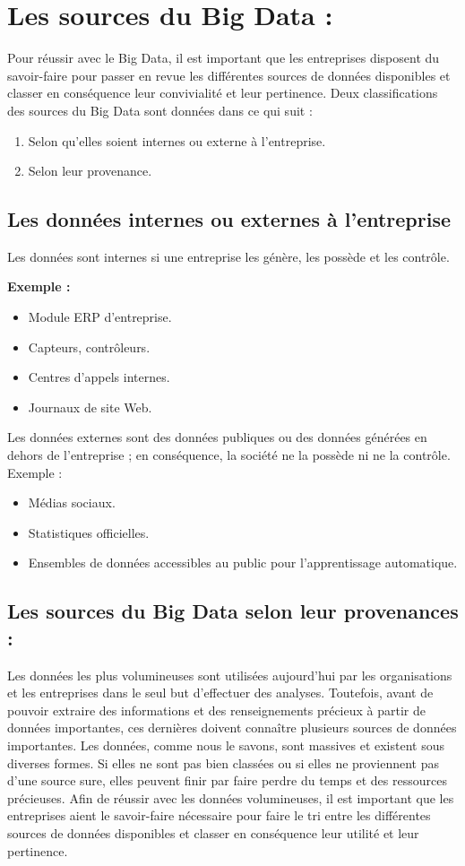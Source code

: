 \section{Les sources du Big Data :}
Pour réussir avec le Big Data, il est important que les entreprises disposent du savoir-faire pour passer en revue les différentes sources de données disponibles et classer en conséquence leur convivialité et leur pertinence. Deux classifications des sources du Big Data sont données dans ce qui suit :

\begin{enumerate}
\item Selon qu'elles soient internes ou externe à l'entreprise.
\item Selon leur provenance.
\end{enumerate}

\subsection{Les données internes ou externes à l'entreprise}
Les données sont internes si une entreprise les génère, les possède et les contrôle.

\textbf{Exemple :}
\begin{itemize}[label=\textbullet]
\item Module ERP d'entreprise.
\item Capteurs, contrôleurs.
\item Centres d'appels internes.
\item Journaux de site Web.
\end{itemize}

Les données externes sont des données publiques ou des données générées en dehors de l'entreprise ; en conséquence, la société ne la possède ni ne la contrôle. Exemple :
\begin{itemize}[label=\textbullet]
\item Médias sociaux.
\item Statistiques officielles.
\item Ensembles de données accessibles au public pour l'apprentissage automatique.
\end{itemize}

\subsection{Les sources du Big Data selon leur provenances :}
Les données les plus volumineuses sont utilisées aujourd'hui par les organisations et les entreprises dans le seul but d'effectuer des analyses. Toutefois, avant de pouvoir extraire des informations et des renseignements précieux à partir de données importantes, ces dernières doivent connaître plusieurs sources de données importantes. Les données, comme nous le savons, sont massives et existent sous diverses formes. Si elles ne sont pas bien classées ou si elles ne proviennent pas d'une source sure, elles peuvent finir par faire perdre du temps et des ressources précieuses. Afin de réussir avec les données volumineuses, il est important que les entreprises aient le savoir-faire nécessaire pour faire le tri entre les différentes sources de données disponibles et classer en conséquence leur utilité et leur pertinence.

